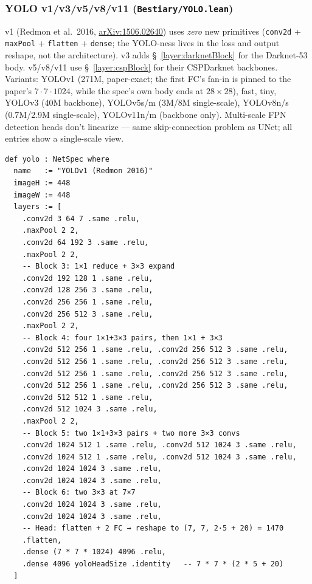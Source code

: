 \subsubsection*{YOLO v1/v3/v5/v8/v11 (\texttt{Bestiary/YOLO.lean})}
v1 (Redmon et al.\ 2016,
\href{https://arxiv.org/abs/1506.02640}{arXiv:1506.02640}) uses
\emph{zero} new primitives (\texttt{conv2d} + \texttt{maxPool} +
\texttt{flatten} + \texttt{dense}; the YOLO-ness lives in the loss and
output reshape, not the architecture). v3 adds \S~\ref{layer:darknetBlock}
for the Darknet-53 body. v5/v8/v11 use \S~\ref{layer:cspBlock} for
their CSPDarknet backbones. Variants: YOLOv1 (271M, paper-exact; the first FC's fan-in is pinned to the
paper's $7 \cdot 7 \cdot 1024$, while the spec's own body ends at $28 \times 28$), fast,
tiny, YOLOv3 (40M backbone), YOLOv5s/m (3M/8M single-scale), YOLOv8n/s
(0.7M/2.9M single-scale), YOLOv11n/m (backbone only). Multi-scale FPN
detection heads don't linearize --- same skip-connection problem as
UNet; all entries show a single-scale view.

\begin{verbatim}
def yolo : NetSpec where
  name   := "YOLOv1 (Redmon 2016)"
  imageH := 448
  imageW := 448
  layers := [
    .conv2d 3 64 7 .same .relu,
    .maxPool 2 2,
    .conv2d 64 192 3 .same .relu,
    .maxPool 2 2,
    -- Block 3: 1×1 reduce + 3×3 expand
    .conv2d 192 128 1 .same .relu,
    .conv2d 128 256 3 .same .relu,
    .conv2d 256 256 1 .same .relu,
    .conv2d 256 512 3 .same .relu,
    .maxPool 2 2,
    -- Block 4: four 1×1+3×3 pairs, then 1×1 + 3×3
    .conv2d 512 256 1 .same .relu, .conv2d 256 512 3 .same .relu,
    .conv2d 512 256 1 .same .relu, .conv2d 256 512 3 .same .relu,
    .conv2d 512 256 1 .same .relu, .conv2d 256 512 3 .same .relu,
    .conv2d 512 256 1 .same .relu, .conv2d 256 512 3 .same .relu,
    .conv2d 512 512 1 .same .relu,
    .conv2d 512 1024 3 .same .relu,
    .maxPool 2 2,
    -- Block 5: two 1×1+3×3 pairs + two more 3×3 convs
    .conv2d 1024 512 1 .same .relu, .conv2d 512 1024 3 .same .relu,
    .conv2d 1024 512 1 .same .relu, .conv2d 512 1024 3 .same .relu,
    .conv2d 1024 1024 3 .same .relu,
    .conv2d 1024 1024 3 .same .relu,
    -- Block 6: two 3×3 at 7×7
    .conv2d 1024 1024 3 .same .relu,
    .conv2d 1024 1024 3 .same .relu,
    -- Head: flatten + 2 FC → reshape to (7, 7, 2·5 + 20) = 1470
    .flatten,
    .dense (7 * 7 * 1024) 4096 .relu,
    .dense 4096 yoloHeadSize .identity   -- 7 * 7 * (2 * 5 + 20)
  ]
\end{verbatim}

